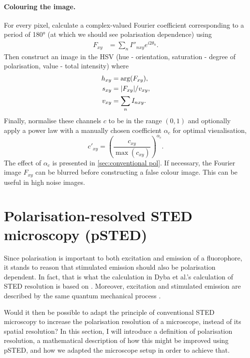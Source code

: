 \paragraph{Colouring the image.} For every pixel, calculate a complex-valued Fourier coefficient corresponding to a period of \ang{180} (at which we should see polarisation dependence) using
\begin{align}
	F_{xy} &= \sum_n I''_{nxy} e^{i2\theta_n}.
\end{align}
Then construct an image in the HSV (hue - orientation, saturation - degree of polarisation, value - total intensity) where 
\begin{align}
	h_{xy} &= \arg (F_{xy}),\\
	s_{xy} &= \abs{F_{xy}}/v_{xy},\\
	v_{xy} &= \sum_n I_{nxy}.
\end{align}
Finally, normalise these channels $ c $ to be in the range $ (0,1) $ and optionally apply a power law with a manually chosen coefficient $ \alpha_c $ for optimal visualisation,
\begin{equation}
	c'_{xy} = \left( \frac{c_{xy}}{\max (c_{xy})} \right)^{\alpha_c}.
\end{equation}
The effect of $ \alpha_c $ is presented in \autoref{sec:conventional pol}. If necessary, the Fourier image $ F_{xy} $ can be blurred before constructing a false colour image. This can be useful in high noise images.

\section{Polarisation-resolved STED microscopy (pSTED)}
\label{sec:methods psted}

Since polarisation is important to both excitation and emission of a fluorophore, it stands to reason that stimulated emission should also be polarisation dependent. In fact, that is what the calculation in Dyba et al.'s calculation of STED resolution is based on \cite{Harke2008, Dyba2005}. Moreover, excitation and stimulated emission are described by the same quantum mechanical process \cite{Foot}.

Would it then be possible to adapt the principle of conventional STED microscopy to increase the polarisation resolution of a microscope, instead of its spatial resolution? In this section, I will introduce a definition of polarisation resolution, a mathematical description of how this might be improved using pSTED, and how we adapted the microscope setup in order to achieve that. 


